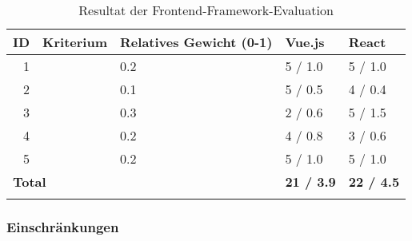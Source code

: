\begin{longtable}{r l p{3cm} l l}
    \toprule
    \textbf{ID} &
        \textbf{Kriterium} 
                                                    & \textbf{Relatives Gewicht (0-1)} &
                                                                                  \textbf{Vue.js} &
                                                                                                  \textbf{React} \\
    \midrule
    1     & \nameref{Analyse Framework:Funktionsumfang}           & 0.2           & 5 / 1.0   & 5 / 1.0  \\
    2     & \nameref{Analyse Framework:Integration Leaflet}       & 0.1           & 5 / 0.5   & 4 / 0.4  \\
    3     & \nameref{Analyse Framework:Integration Vector Tiles}  & 0.3           & 2 / 0.6   & 5 / 1.5  \\
    4     & \nameref{Analyse Framework:Lernkurve}                 & 0.2           & 4 / 0.8   & 3 / 0.6  \\
    5     & \nameref{Analyse Framework:Tooling}                   & 0.2           & 5 / 1.0   & 5 / 1.0  \\
    \bottomrule
    \multicolumn{3}{l}{\textbf{Total}}                                            & \textbf{21 / 3.9}
                                                                                            & \textbf{22 / 4.5} \\
    \caption{Resultat der Frontend-Framework-Evaluation}
    \label{table:Resultat der Frontend-Framework-Evaluation}
\end{longtable}



\subsubsection{Einschränkungen}
\label{Analyse:Einschränkungen}

